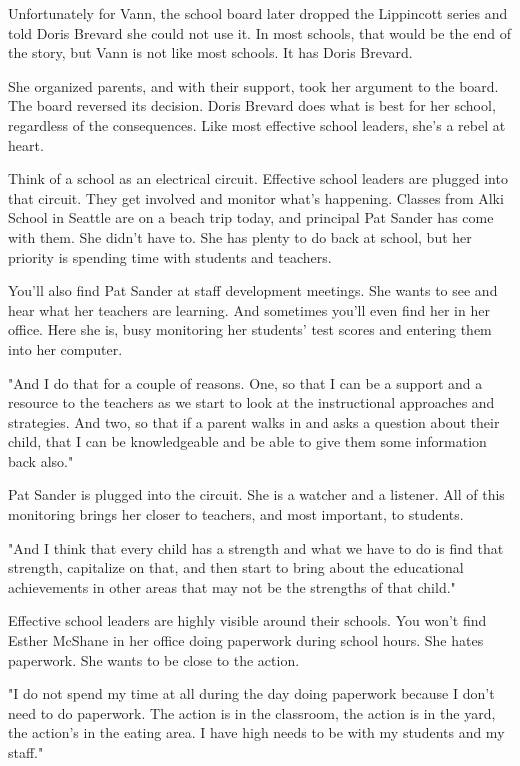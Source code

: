 Unfortunately for Vann, the school board later dropped the Lippincott series and told Doris Brevard she could not use it. In most schools, that would be the end of the story, but Vann is not like most schools. It has Doris Brevard.

She organized parents, and with their support, took her argument to the board. The board reversed its decision. Doris Brevard does what is best for her school, regardless of the consequences. Like most effective school leaders, she's a rebel at heart.

Think of a school as an electrical circuit. Effective school leaders are plugged into that circuit. They get involved and monitor what's happening. Classes from Alki School in Seattle are on a beach trip today, and principal Pat Sander has come with them. She didn't have to. She has plenty to do back at school, but her priority is spending time with students and teachers.

You'll also find Pat Sander at staff development meetings. She wants to see and hear what her teachers are learning. And sometimes you'll even find her in her office. Here she is, busy monitoring her students' test scores and entering them into her computer.

"And I do that for a couple of reasons. One, so that I can be a support and a resource to the teachers as we start to look at the instructional approaches and strategies. And two, so that if a parent walks in and asks a question about their child, that I can be knowledgeable and be able to give them some information back also."

Pat Sander is plugged into the circuit. She is a watcher and a listener. All of this monitoring brings her closer to teachers, and most important, to students.

"And I think that every child has a strength and what we have to do is find that strength, capitalize on that, and then start to bring about the educational achievements in other areas that may not be the strengths of that child."

Effective school leaders are highly visible around their schools. You won't find Esther McShane in her office doing paperwork during school hours. She hates paperwork. She wants to be close to the action.

"I do not spend my time at all during the day doing paperwork because I don't need to do paperwork. The action is in the classroom, the action is in the yard, the action's in the eating area. I have high needs to be with my students and my staff."

